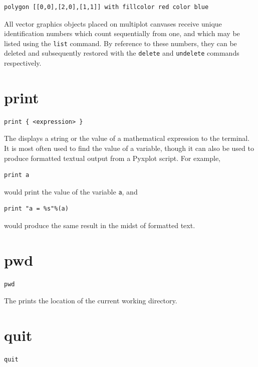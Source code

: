 \begin{verbatim}
polygon [[0,0],[2,0],[1,1]] with fillcolor red color blue
\end{verbatim}

All vector graphics objects placed on multiplot canvases receive unique
identification numbers which count sequentially from one, and which may be
listed using the {\tt list} command.  By reference to these numbers, they can
be deleted and subsequently restored with the {\tt delete} and {\tt undelete}
commands respectively.


\section{print}

\begin{verbatim}
print { <expression> }
\end{verbatim}

The  displays a string or the value of a mathematical expression to the
terminal. It is most often used to find the value of a variable, though it can
also be used to produce formatted textual output from a Pyxplot script. For example,

\begin{verbatim}
print a
\end{verbatim}

\noindent would print the value of the variable {\tt a}, and

\begin{verbatim}
print "a = %s"%(a)
\end{verbatim}

\noindent would produce the same result in the midst of formatted text.


\section{pwd}

\begin{verbatim}
pwd
\end{verbatim}

The  prints the location of the current working directory.


\section{quit}

\begin{verbatim}
quit
\end{verbatim}

